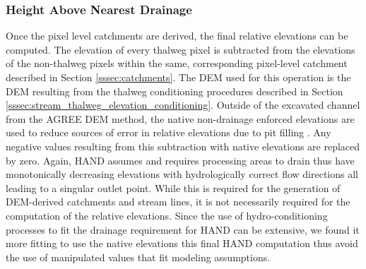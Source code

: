 \documentclass[draft]{dependencies/agujournal2019}
\begin{document}
\subsubsection{Height Above Nearest Drainage}
%
Once the pixel level catchments are derived, the final relative elevations can be computed.
The elevation of every thalweg pixel is subtracted from the elevations of the non-thalweg pixels within the same, corresponding pixel-level catchment described in Section \ref{sssec:catchments}.
The DEM used for this operation is the DEM resulting from the thalweg conditioning procedures described in Section \ref{sssec:stream_thalweg_elevation_conditioning}.
Outside of the excavated channel from the AGREE DEM method, the native non-drainage enforced elevations are used to reduce sources of error in relative elevations due to pit filling \cite{djokic2019arc}.
Any negative values resulting from this subtraction with native elevations are replaced by zero.
Again, HAND assumes and requires processing areas to drain thus have monotonically decreasing elevations with hydrologically correct flow directions all leading to a singular outlet point.
While this is required for the generation of DEM-derived catchments and stream lines, it is not necessarily required for the computation of the relative elevations.
Since the use of hydro-conditioning processes to fit the drainage requirement for HAND can be extensive, we found it more fitting to use the native elevations this final HAND computation thus avoid the use of manipulated values that fit modeling assumptions.
%
\end{document}
